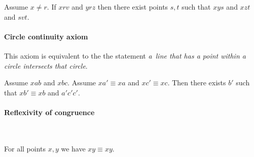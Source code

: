 \documentclass[10pt,a4paper,parskip=half,numbers=endperiod,headings=standardclasses,parskip]{scrartcl}
\newcommand{\Cong}[4]{#1 #2 \equiv #3 #4}
\newcommand{\Betw}[3]{#1 #2 #3}
\newcommand{\aprime}{a'}
\newcommand{\bprime}{b'}
\newcommand{\cprime}{c'}
\begin{document}
  \begin{forthel}
    \begin{axiom}[A10]
      Assume $x \neq r$.
      If $\Betw{x}{r}{v}$ and $\Betw{y}{r}{z}$
      then there exist points $s,t$ such that
      $\Betw{x}{y}{s}$ and $\Betw{x}{z}{t}$ and $\Betw{s}{v}{t}$.
    \end{axiom}
  \end{forthel}


  \paragraph{Circle continuity axiom}
  This axiom is equivalent to the the statement
  \textit{a~line that has a point within a circle intersects that circle}.


  \begin{forthel}
    \begin{axiom}[CA]
      Assume $\Betw{x}{a}{b}$ and $\Betw{x}{b}{c}$.
      Assume
        $\Cong{x}{\aprime}{x}{a}$ and
        $\Cong{x}{\cprime}{x}{c}$.
      Then there exists $\bprime$ such that $\Cong{x}{\bprime}{x}{b}$ and $\Betw{\aprime}{\cprime}{\cprime}$.
    \end{axiom}
  \end{forthel}







  \paragraph{Reflexivity of congruence}\

  \begin{forthel}
    \begin{lemma} %
      For all points $x, y$ we have $\Cong{x}{y}{x}{y}$.
    \end{lemma}
  \end{forthel}
\end{document}
